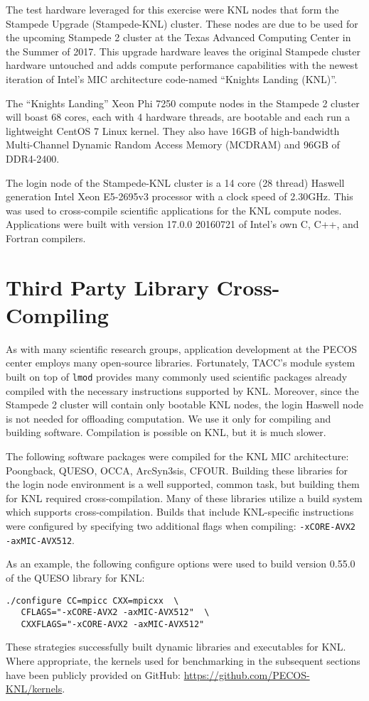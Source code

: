 The test hardware leveraged for this exercise were KNL nodes that form the
Stampede Upgrade (Stampede-KNL) cluster.  These nodes are due to be used for
the upcoming Stampede 2 cluster at the Texas Advanced Computing Center in the
Summer of 2017.  This upgrade hardware leaves the original Stampede cluster
hardware untouched and adds compute performance capabilities with the newest
iteration of Intel's MIC architecture code-named ``Knights Landing (KNL)''.

The ``Knights Landing'' Xeon Phi 7250 compute nodes in the Stampede 2 cluster
will boast 68 cores, each with 4 hardware threads, are bootable and each run a
lightweight CentOS 7 Linux kernel.  They also have 16GB of high-bandwidth
Multi-Channel Dynamic Random Access Memory (MCDRAM) and 96GB of DDR4-2400.

The login node of the Stampede-KNL cluster is a 14 core (28 thread)
Haswell generation Intel Xeon E5-2695v3 processor with a clock speed of
2.30GHz.  This was used to cross-compile scientific applications for the KNL
compute nodes.  Applications were built with version 17.0.0 20160721 of Intel's
own C, C++, and Fortran compilers.

\section{Third Party Library Cross-Compiling}
\label{sec:cross_compile}

As with many scientific research groups, application development at the PECOS
center employs many open-source libraries.  Fortunately, TACC's module system
built on top of \texttt{lmod} provides many commonly used scientific packages
already compiled with the necessary instructions supported by KNL.  Moreover,
since the Stampede 2 cluster will contain only bootable KNL nodes, the login
Haswell node is not needed for offloading computation.  We use it only for
compiling and building software.  Compilation is possible on KNL, but it is
much slower.

The following software packages were compiled for the KNL MIC architecture:
Poongback, QUESO, OCCA, ArcSyn3sis, CFOUR.  Building these libraries
for the login node environment is a well supported, common task, but building
them for KNL required cross-compilation.  Many of these libraries utilize a
build system which supports cross-compilation.  Builds that include
KNL-specific instructions were configured by specifying two additional flags
when compiling: \texttt{-xCORE-AVX2 -axMIC-AVX512}.

As an example, the following configure options were used to build version
0.55.0 of the QUESO library for KNL:

{\small
\begin{verbatim}
./configure CC=mpicc CXX=mpicxx  \
   CFLAGS="-xCORE-AVX2 -axMIC-AVX512"  \
   CXXFLAGS="-xCORE-AVX2 -axMIC-AVX512"
\end{verbatim}
}

These strategies successfully built dynamic libraries and executables for KNL.
Where appropriate, the kernels used for benchmarking in the subsequent sections have been
publicly provided on GitHub: \url{https://github.com/PECOS-KNL/kernels}.
